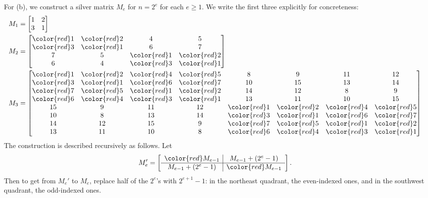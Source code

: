 \documentclass[11pt]{scrartcl}
\begin{document}
For (b), we construct a silver matrix $M_e$ for $n = 2^e$ for each $e \ge 1$.
We write the first three explicitly for concreteness:
\begin{align*}
  M_1 &= \begin{bmatrix}
    1 & 2 \\ 3 & 1
  \end{bmatrix} \\
  M_2 &= \begin{bmatrix}
    {\color{red}1} & {\color{red}2} & 4 & 5 \\
    {\color{red}3} & {\color{red}1} & 6 & 7 \\
    7 & 5 & {\color{red}1} & {\color{red}2} \\
    6 & 4 & {\color{red}3} & {\color{red}1}
  \end{bmatrix} \\
  M_3 &= \begin{bmatrix}
    {\color{red}1} & {\color{red}2} & {\color{red}4} & {\color{red}5} & 8 & 9 & 11 & 12\\
    {\color{red}3} & {\color{red}1} & {\color{red}6} & {\color{red}7} & 10 & 15 & 13 & 14 \\
    {\color{red}7} & {\color{red}5} & {\color{red}1} & {\color{red}2} & 14 & 12 & 8 & 9 \\
    {\color{red}6} & {\color{red}4} & {\color{red}3} & {\color{red}1} & 13 & 11 & 10 & 15 \\
    15 & 9 & 11 & 12 & {\color{red}1} & {\color{red}2} & {\color{red}4}
    & {\color{red}5} \\
    10 & 8 & 13 & 14 & {\color{red}3} & {\color{red}1} & {\color{red}6}
    & {\color{red}7} \\
    14 & 12 & 15 & 9 & {\color{red}7} & {\color{red}5} & {\color{red}1}
    & {\color{red}2} \\
    13 & 11 & 10 & 8 & {\color{red}6} & {\color{red}4} & {\color{red}3}
    & {\color{red}1} \\
  \end{bmatrix}
\end{align*}
The construction is described recursively as follows.
Let
\[
  M_e' = \left[
  \begin{array}{c|c}
    {\color{red}M_{e-1}} & M_{e-1} + (2^e-1) \\ \hline
    M_{e-1} + (2^e-1) & {\color{red}M_{e-1}} \\
  \end{array}
  \right].
\]
Then to get from $M_e'$ to $M_e$,
replace half of the $2^e$'s with $2^{e+1}-1$:
in the northeast quadrant, the even-indexed ones,
and in the southwest quadrant, the odd-indexed ones.
\end{document}

